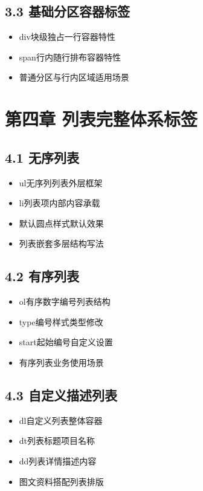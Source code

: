 \subsection{3.3 基础分区容器标签}
\begin{itemize}[leftmargin=*]
\item div块级独占一行容器特性
\item span行内随行排布容器特性
\item 普通分区与行内区域适用场景
\end{itemize}

\section{第四章 列表完整体系标签}
\subsection{4.1 无序列表}
\begin{itemize}[leftmargin=*]
\item ul无序列列表外层框架
\item li列表项内部内容承载
\item 默认圆点样式默认效果
\item 列表嵌套多层结构写法
\end{itemize}

\subsection{4.2 有序列表}
\begin{itemize}[leftmargin=*]
\item ol有序数字编号列表结构
\item type编号样式类型修改
\item start起始编号自定义设置
\item 有序列表业务使用场景
\end{itemize}

\subsection{4.3 自定义描述列表}
\begin{itemize}[leftmargin=*]
\item dl自定义列表整体容器
\item dt列表标题项目名称
\item dd列表详情描述内容
\item 图文资料搭配列表排版
\end{itemize}

